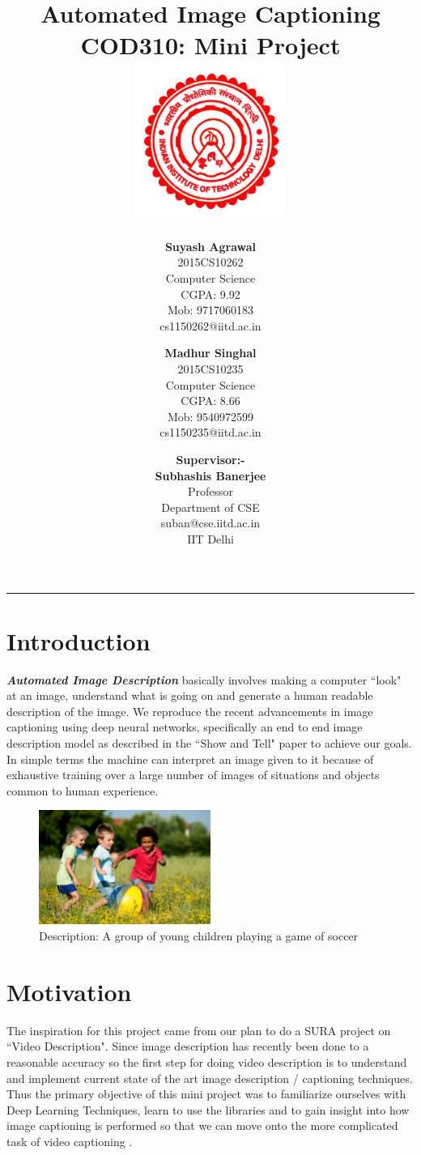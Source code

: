 \documentclass[11pt]{article}
\title{\vspace*{\fill} \textbf{Automated Image Captioning}
	  \\ {\large \textbf{COD310: Mini Project}}
	  \\  \vspace{3mm} \includegraphics[width=5cm]{logo.jpg}}
\author{
	\textbf{Suyash Agrawal}\\ 
	2015CS10262\\
	Computer Science\\
	CGPA: 9.92 \\
	Mob: 9717060183\\
	cs1150262@iitd.ac.in
	\and
	\textbf{Madhur Singhal}\\ 
	2015CS10235\\
	Computer Science\\
	CGPA: 8.66\\
	Mob: 9540972599\\
	cs1150235@iitd.ac.in
}
\date{\textbf{Supervisor:-} \\ \textbf{Subhashis Banerjee} \\ Professor \\ Department of CSE \\ suban@cse.iitd.ac.in\\ IIT Delhi\\
\vspace*{\fill}}
\begin{document}
	\maketitle

\begin{center}
\noindent\rule{3.2cm}{0.4pt} 
\end{center}

	\newpage
	
	\section{Introduction}
	\textit{\textbf{Automated Image Description}} basically involves making a computer ``look" at an image, understand what is going on and generate a human readable description of the image. We reproduce the recent advancements in image captioning using deep neural networks, specifically an end to end image description model as described in the ``Show and Tell"\cite{showandtell} paper to achieve our goals. In simple terms the machine can interpret an image given to it because of exhaustive training over a large number of images of situations and objects common to human experience.
	
	\begin{figure}[h]
	\centering
	\includegraphics[width=0.5\textwidth]{children.jpeg}
	\caption{Description: A group of young children playing a game of soccer}
	\centering
	\end{figure}

	\section{Motivation}

The inspiration for this project came from our plan to do a SURA project on ``Video Description". Since image description has recently been done to a reasonable accuracy so the first step for doing video description is to understand and implement current state of the art image description / captioning techniques. Thus the primary objective of this mini project was to familiarize ourselves with Deep Learning Techniques, learn to use the libraries and to gain insight into how image captioning is performed so that we can move onto the more complicated task of video captioning .	
\end{document}
